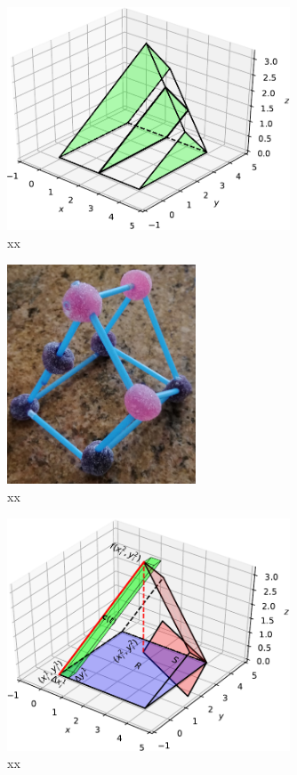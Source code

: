 \documentclass{article}
\theoremstyle{theorem}
\theoremstyle{definition}
\begin{document}
\begin{figure}[htb]
\centering
\includegraphics[width=0.75\textwidth]{prismatoid.pdf}
\caption{xx}
\label{fig:prismatoid}
\end{figure}

\begin{figure}[htb]
\centering
\includegraphics[width=0.5\textwidth]{prismatoid_real.jpg}
\caption{xx}
\label{fig:prismatoid_real}
\end{figure}

\begin{figure}[htb]
\centering
\includegraphics[width=0.75\textwidth]{prismatoid_solid.pdf}
\caption{xx}
\label{fig:prismatoid_solid}
\end{figure}
\end{document}
